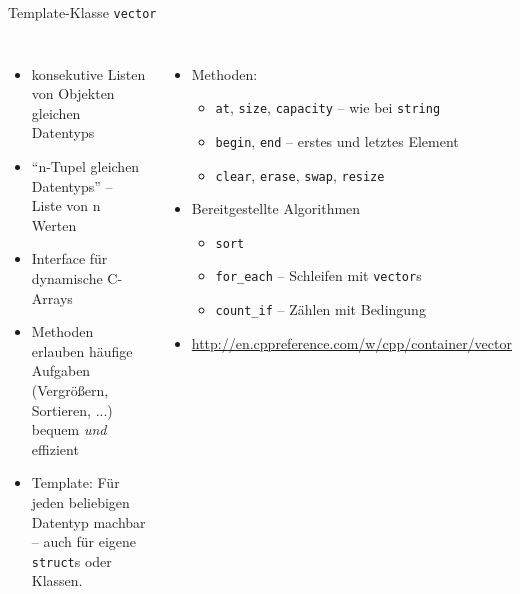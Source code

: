 \begin{frame}{Template-Klasse \texttt{vector}}
%
\begin{columns}[T]
\begin{itemize}
\item konsekutive Listen von Objekten gleichen Datentyps
\item \enquote{n-Tupel gleichen Datentyps} -- Liste von n Werten
\item Interface für dynamische C-Arrays
\item Methoden erlauben häufige Aufgaben (Vergrößern, Sortieren, ...) bequem \emph{und} effizient
\item Template: Für jeden beliebigen Datentyp machbar -- auch für eigene \texttt{struct}s oder Klassen.
\end{itemize}
%
\begin{itemize}
\item Methoden:
	\begin{itemize}
	\item \texttt{at}, \texttt{size}, \texttt{capacity} -- wie bei \texttt{string}
	\item \texttt{begin}, \texttt{end} -- erstes und letztes Element
	\item \texttt{clear}, \texttt{erase}, \texttt{swap}, \texttt{resize}
	\end{itemize}
\item Bereitgestellte Algorithmen
	\begin{itemize}
	\item \texttt{sort}
	\item \texttt{for\_each} -- Schleifen mit \texttt{vector}s
	\item \texttt{count\_if} -- Zählen mit Bedingung
	\end{itemize}
\item \url{http://en.cppreference.com/w/cpp/container/vector}
\end{itemize}
\end{columns}
%
\end{frame}


